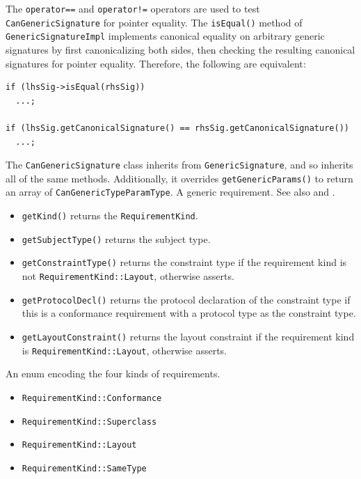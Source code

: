 \documentclass[../generics]{subfiles}
\begin{document}
The \texttt{operator==} and \texttt{operator!=} operators are used to test \texttt{CanGenericSignature} for pointer equality. The \texttt{isEqual()} method of \texttt{GenericSignatureImpl} implements canonical equality on arbitrary generic signatures by first canonicalizing both sides, then checking the resulting canonical signatures for pointer equality. Therefore, the following are equivalent:
\begin{Verbatim}
if (lhsSig->isEqual(rhsSig))
  ...;

if (lhsSig.getCanonicalSignature() == rhsSig.getCanonicalSignature())
  ...;
\end{Verbatim}
The \texttt{CanGenericSignature} class inherits from \texttt{GenericSignature}, and so inherits all of the same methods. Additionally, it overrides \texttt{getGenericParams()} to return an array of \texttt{CanGenericTypeParamType}.
A generic requirement. See also  and .
\begin{itemize}
\item \texttt{getKind()} returns the \texttt{RequirementKind}.
\item \texttt{getSubjectType()} returns the subject type.
\item \texttt{getConstraintType()} returns the constraint type if the requirement kind is not \texttt{RequirementKind::Layout}, otherwise asserts.
\item \texttt{getProtocolDecl()} returns the protocol declaration of the constraint type if this is a conformance requirement with a protocol type as the constraint type.
\item \texttt{getLayoutConstraint()} returns the layout constraint if the requirement kind is \texttt{RequirementKind::Layout}, otherwise asserts.
\end{itemize}

An enum encoding the four kinds of requirements.
\begin{itemize}
\item \texttt{RequirementKind::Conformance}
\item \texttt{RequirementKind::Superclass}
\item \texttt{RequirementKind::Layout}
\item \texttt{RequirementKind::SameType}
\end{itemize}
\end{document}
